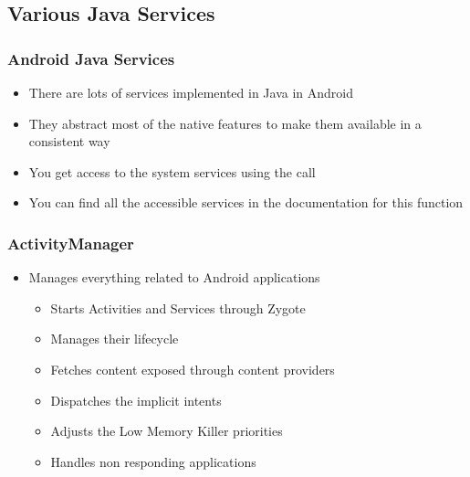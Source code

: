 \subsection{Various Java Services}

\begin{frame}
  \frametitle{Android Java Services}
  \begin{itemize}
  \item There are lots of services implemented in Java in Android
  \item They abstract most of the native features to make them
    available in a consistent way
  \item You get access to the system services using the
     call
  \item You can find all the accessible services in the documentation 
    for this function
  \end{itemize}
\end{frame}

\begin{frame}
  \frametitle{ActivityManager}
    \begin{itemize}
    \item Manages everything related to Android applications
      \begin{itemize}
      \item Starts Activities and Services through Zygote
      \item Manages their lifecycle
      \item Fetches content exposed through content providers
      \item Dispatches the implicit intents
      \item Adjusts the Low Memory Killer priorities
      \item Handles non responding applications
      \end{itemize}
  \end{itemize}
\end{frame}

